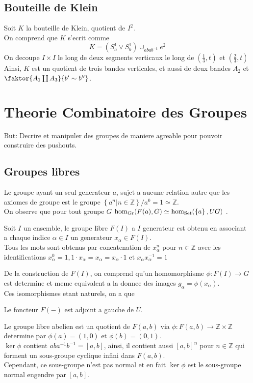 \documentclass[../main.tex]{subfiles}
\begin{document}
\subsection{Bouteille de Klein}
Soit $K$ la bouteille de Klein, quotient de $ I^{2}$.\\
On comprend que $K$ s'ecrit comme
\[ 
K = ( S^{1}_a \vee S^{1}_b) \cup_{abab^{-1}} e^{2}
\]
On decoupe $I\times I$ le long de deux segments verticaux le long de $ ( \frac{1}{3},t) $ et $ ( \frac{2}{3},t )$\\
Ainsi, $K$ est un quotient de trois bandes verticales, et aussi de deux bandes $ A_2$ et $ \faktor { A_1\coprod A_3} { b'\sim b''} $.\\
\section{Theorie Combinatoire des Groupes}
But: Decrire et manipuler des groupes de maniere agreable pour pouvoir construire des pushouts.
\subsection{Groupes libres}
\begin{exemple}
Le groupe ayant un seul generateur $a$, sujet a aucune relation autre que les axiomes de groupe est le groupe $ \left\{ a^{n}| n \in \mathbb{Z} \right\} / a^{0}=1\simeq \mathbb{Z}$.\\
On observe que pour tout groupe $G$  $ \hom_{ \operatorname{Gr} } ( F( a) , G) \simeq \hom_{\operatorname{Set}} ( \left\{ a \right\} , UG)  $ .
\end{exemple}
\begin{defn}
	Soit $I$ un ensemble, le groupe libre $F( I) $ a $I$ generateur est obtenu en associant a chaque indice $\alpha \in I$ un generateur $x_\alpha\in F( I) $.\\
	Tous les mots sont obtenus par concatenation de $x_\alpha ^{n}$ pour $n\in \mathbb{Z}$ avec les identifications $x_\alpha ^{0}= 1, 1\cdot x_\alpha = x_\alpha = x_\alpha \cdot 1$ et $x_\alpha x_\alpha ^{-1} = 1$ 
\end{defn}
De la construction de $F( I) $, on comprend qu'un homomorphisme $\phi:F( I) \to G$ est determine et meme equivalent a la donnee des images $g_\alpha = \phi( x_\alpha) $.\\
Ces isomorphismes  etant naturels, on a que
\begin{propo}
Le foncteur $F( -) $ est adjoint a gauche de $U$.
\end{propo}
Le groupe libre abelien est un quotient de $F( a,b) $ via $\phi: F( a,b) \to \mathbb{Z}\times \mathbb{Z}$ determine par $\phi( a) = ( 1,0) $ et $\phi( b) = ( 0,1) $.\\
$\ker\phi$ contient $aba^{-1}b^{-1}= [ a,b] $, ainsi, il contient  aussi $ [ a,b]^{n}$ pour $ n \in \mathbb{Z}$ qui forment un sous-groupe cyclique infini dans $F( a,b) $.\\
Cependant, ce sous-groupe n'est pas normal et en fait $\ker\phi$ est le sous-groupe normal engendre par $ [ a,b] $.\\
\end{document}
